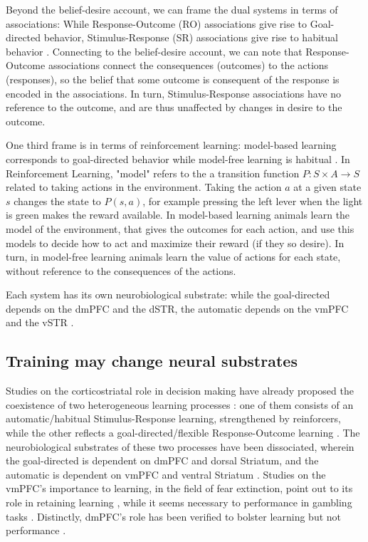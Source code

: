         Beyond the belief-desire account, we can frame the dual systems in terms of associations: While Response-Outcome (RO) associations give rise to Goal-directed behavior, Stimulus-Response (SR) associations give rise to habitual behavior \cite{dickinson2015instrumental}. Connecting to the belief-desire account, we can note that Response-Outcome associations connect the consequences (outcomes) to the actions (responses), so the belief that some outcome is consequent of the response is encoded in the associations. In turn, Stimulus-Response associations have no reference to the outcome, and are thus unaffected by changes in desire to the outcome.
        
        One third frame is in terms of reinforcement learning: model-based learning corresponds to goal-directed behavior while model-free learning is habitual \cite{decker2016creatures}. In Reinforcement Learning, "model" refers to the a transition function $P: S\times A \rightarrow S$ related to taking actions in the environment. Taking the action $a$ at a given state $s$ changes the state to $P(s, a)$, for example pressing the left lever when the light is green makes the reward available. In model-based learning animals learn the model of the environment, that gives the outcomes for each action, and use this models to decide how to act and maximize their reward (if they so desire). In turn, in model-free learning animals learn the value of actions for each state, without reference to the consequences of the actions.
        
        Each system has its own neurobiological substrate: while the goal-directed depends on the dmPFC and the dSTR, the automatic depends on the vmPFC and the vSTR \cite{dickinson2015instrumental}. 

    \subsection{Training may change neural substrates}
        Studies on the corticostriatal role in decision making have already proposed the coexistence of two heterogeneous learning processes \cite{balleine1998goal, balleine2007role, smith2013dual}: one of them consists of an automatic/habitual Stimulus-Response learning, strengthened by reinforcers, while the other reflects a goal-directed/flexible Response-Outcome learning \cite{dickinson2015instrumental}. The neurobiological substrates of these two processes have been dissociated, wherein the goal-directed is dependent on dmPFC and dorsal Striatum, and the automatic is dependent on vmPFC and ventral Striatum \cite{dickinson2015instrumental}. Studies on the vmPFC's importance to learning, in the field of fear extinction, point out to its role in retaining learning \cite{phelps2004extinction}, while it seems necessary to performance in gambling tasks \cite{rogalsky2012risky}. Distinctly, dmPFC's role has been verified to bolster learning but not performance \cite{balleine2007still}.

